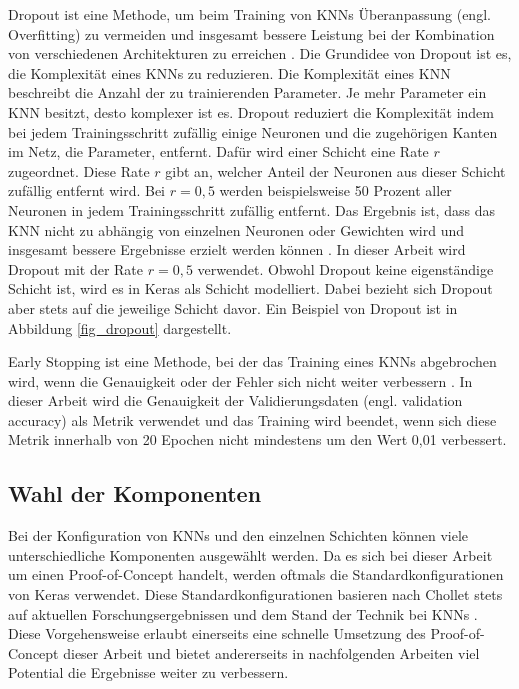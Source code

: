 Dropout ist eine Methode, um beim Training von \acp{KNN} Überanpassung (engl. Overfitting) zu vermeiden und insgesamt bessere Leistung bei der Kombination von verschiedenen Architekturen zu erreichen \cite{hinton2012improving}. Die Grundidee von Dropout ist es, die Komplexität eines \acp{KNN} zu reduzieren. Die Komplexität eines \ac{KNN} beschreibt die Anzahl der zu trainierenden Parameter. Je mehr Parameter ein \ac{KNN} besitzt, desto komplexer ist es. Dropout reduziert die Komplexität indem bei jedem Trainingsschritt zufällig einige Neuronen und die zugehörigen Kanten im Netz, die Parameter, entfernt. Dafür wird einer Schicht eine Rate $r$ zugeordnet. Diese Rate $r$ gibt an, welcher Anteil der Neuronen aus dieser Schicht zufällig entfernt wird. Bei $r=0,5$ werden beispielsweise 50 Prozent aller Neuronen in jedem Trainingsschritt zufällig entfernt. Das Ergebnis ist, dass das \ac{KNN} nicht zu abhängig von einzelnen Neuronen oder Gewichten wird und insgesamt bessere Ergebnisse erzielt werden können \cite{srivastava2014dropout}. In dieser Arbeit wird Dropout mit der Rate $r=0,5$ verwendet. Obwohl Dropout keine eigenständige Schicht ist, wird es in Keras als Schicht modelliert. Dabei bezieht sich Dropout aber stets auf die jeweilige Schicht davor. Ein Beispiel von Dropout ist in Abbildung \ref{fig_dropout} dargestellt.

Early Stopping ist eine Methode, bei der das Training eines \acp{KNN} abgebrochen wird, wenn die Genauigkeit oder der Fehler sich nicht weiter verbessern \cite{prechelt1998early}. In dieser Arbeit wird die Genauigkeit der Validierungsdaten (engl. validation accuracy) als Metrik verwendet und das Training wird beendet, wenn sich diese Metrik innerhalb von 20 Epochen nicht mindestens um den Wert 0,01 verbessert.


\subsection{Wahl der Komponenten}
\label{umsetzung_training_experimente}

Bei der Konfiguration von \acp{KNN} und den einzelnen Schichten können viele unterschiedliche Komponenten ausgewählt werden. Da es sich bei dieser Arbeit um einen Proof-of-Concept handelt, werden oftmals die Standardkonfigurationen von Keras verwendet. Diese Standardkonfigurationen basieren nach Chollet stets auf aktuellen Forschungsergebnissen und dem Stand der Technik bei \acp{KNN} \cite{chollet2015keras}. Diese Vorgehensweise erlaubt einerseits eine schnelle Umsetzung des Proof-of-Concept dieser Arbeit und bietet andererseits in nachfolgenden Arbeiten viel Potential die Ergebnisse weiter zu verbessern.

